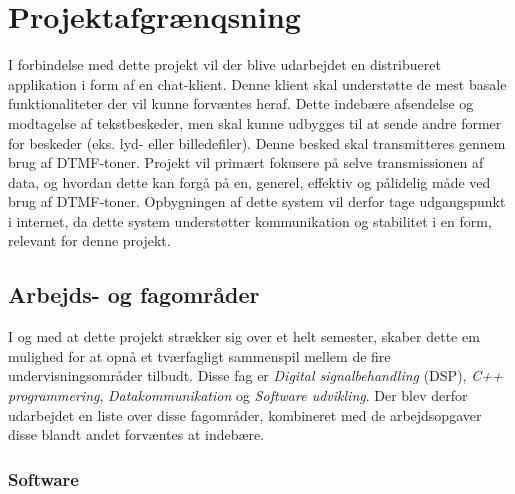 \section{Projektafgrænqsning}
I forbindelse med dette projekt vil der blive udarbejdet en distribueret applikation i form af en chat-klient. Denne klient skal understøtte de mest basale funktionaliteter der vil kunne forvæntes heraf. Dette indebære afsendelse og modtagelse af tekstbeskeder, men skal kunne udbygges til at sende andre former for beskeder (eks. lyd- eller billedefiler). Denne besked skal transmitteres gennem brug af DTMF-toner. 
Projekt vil primært fokusere på selve transmissionen af data, og hvordan dette kan forgå på en, generel, effektiv og pålidelig måde ved brug af DTMF-toner. Opbygningen af dette system vil derfor tage udgangspunkt i internet, da dette system understøtter kommunikation og stabilitet i en form, relevant for denne projekt. 




\subsection{Arbejds- og fagområder}

I og med at dette projekt strækker sig over et helt semester, skaber dette em mulighed for at opnå et tværfagligt sammenspil mellem de fire undervisningsområder tilbudt. Disse fag er \textit{Digital signalbehandling} (DSP), \textit{ C++ programmering}, \textit{Datakommunikation} og \textit{Software udvikling}. Der blev derfor udarbejdet en liste over disse fagområder, kombineret med de arbejdsopgaver disse blandt andet forvæntes at indebære.   


\subsubsection{Software}

